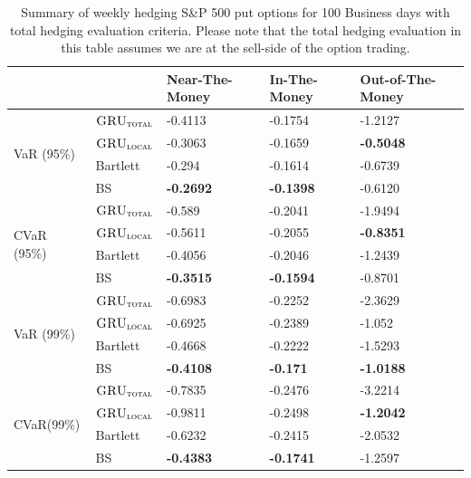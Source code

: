 \documentclass[letterpaper,12pt,titlepage,oneside,final]{book}
\numberwithin{equation}{section}
\theoremstyle{definition}
\newcommand{\modelT}{\textsc{GRU}_{\textsc{total}}}
\newcommand{\modelL}{\textsc{GRU}_{\textsc{local}}}
\begin{document}
\begin{table}[htp!]
	\centering
	\begin{tabular}{ll|l|l|l|}
		\cline{3-5}
		&          & Near-The-Money   & In-The-Money     & Out-of-The-Money  \\ \hline
		\multicolumn{1}{|l|}{\multirow{4}{*}{VaR (95\%)}}     & $\modelT$    &-0.4113 &-0.1754 &-1.2127  \\ 
		\multicolumn{1}{|l|}{}                                & $\modelL$    &-0.3063 &-0.1659 &\textbf{-0.5048}           \\ 
		\multicolumn{1}{|l|}{}                                & Bartlett 	 &-0.294  &-0.1614 &-0.6739           \\  
		\multicolumn{1}{|l|}{}                                & BS       	 &\textbf{-0.2692} &\textbf{-0.1398} &-0.6120           \\ 
		\hline
		\multicolumn{1}{|l|}{\multirow{4}{*}{CVaR (95\%)}}    & $\modelT$    &-0.589  &-0.2041 &-1.9494 \\ 
		\multicolumn{1}{|l|}{}                                & $\modelL$    &-0.5611 &-0.2055 &\textbf{-0.8351}         \\  
		\multicolumn{1}{|l|}{}                                & Bartlett 	 &-0.4056 &-0.2046 &-1.2439          \\  
		\multicolumn{1}{|l|}{}                                & BS       	 &\textbf{-0.3515} &\textbf{-0.1594} &-0.8701          \\ 
		\hline
		\multicolumn{1}{|l|}{\multirow{4}{*}{VaR (99\%)}}     & $\modelT$    &-0.6983 &-0.2252 &-2.3629 \\  
		\multicolumn{1}{|l|}{}                                & $\modelL$    &-0.6925 &-0.2389 &-1.052           \\ 
		\multicolumn{1}{|l|}{}                                & Bartlett 	 &-0.4668 &-0.2222 &-1.5293         \\  
		\multicolumn{1}{|l|}{}                                & BS       	 &\textbf{-0.4108} &\textbf{-0.171}  &\textbf{-1.0188}          \\ 
		\hline
		\multicolumn{1}{|l|}{\multirow{4}{*}{CVaR(99\%)}}     & $\modelT$    &-0.7835 &-0.2476 &-3.2214 \\  
		\multicolumn{1}{|l|}{}                                & $\modelL$    &-0.9811 &-0.2498 &\textbf{-1.2042}         \\ 
		\multicolumn{1}{|l|}{}                                & Bartlett     &-0.6232 &-0.2415 &-2.0532          \\ 
		\multicolumn{1}{|l|}{}                                & BS       	 &\textbf{-0.4383} &\textbf{-0.1741} &-1.2597          \\ \hline
	\end{tabular}
	\caption{Summary of weekly hedging S\&P 500 put options for 100 Business days with total hedging evaluation criteria. Please note that the total hedging evaluation in this table assumes we are at the sell-side of the option trading.} \label{table:putTotalWBuy}
\end{table}
\end{document}
